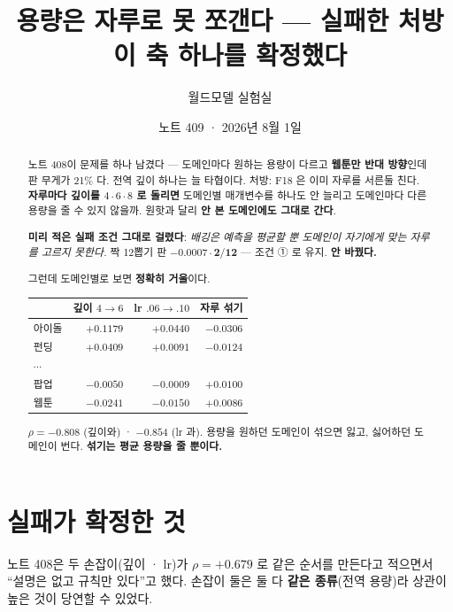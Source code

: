 \documentclass[11pt]{article}
\begin{document}
\title{용량은 자루로 못 쪼갠다 --- 실패한 처방이 축 하나를 확정했다}
\author{월드모델 실험실}
\date{노트 409 · 2026년 8월 1일}
\maketitle

\begin{abstract}
노트 408이 문제를 하나 남겼다 --- 도메인마다 원하는 용량이 다르고
\textbf{웹툰만 반대 방향}인데 판 무게가 21\% 다. 전역 깊이 하나는 늘
타협이다. 처방: F18 은 이미 자루를 서른둘 친다. \textbf{자루마다 깊이를
$4 \cdot 6 \cdot 8$ 로 돌리면} 도메인별 매개변수를 하나도 안 늘리고
도메인마다 다른 용량을 줄 수 있지 않을까. 원핫과 달리 \textbf{안 본
도메인에도 그대로 간다}.

\textbf{미리 적은 실패 조건 그대로 걸렸다}: \emph{배깅은 예측을 평균할 뿐
도메인이 자기에게 맞는 자루를 고르지 못한다.} 짝 12뽑기 판
$\mathbf{-0.0007 \cdot 2/12}$ --- 조건 ① 로 유지. \textbf{안 바꿨다.}

그런데 도메인별로 보면 \textbf{정확히 거울}이다.

\begin{center}
\begin{tabular}{lrrr}
\hline
 & 깊이 $4{\to}6$ & lr $.06{\to}.10$ & \textbf{자루 섞기} \\
\hline
아이돌 & $+0.1179$ & $+0.0440$ & $\mathbf{-0.0306}$ \\
펀딩 & $+0.0409$ & $+0.0091$ & $\mathbf{-0.0124}$ \\
$\cdots$ & & & \\
팝업 & $-0.0050$ & $-0.0009$ & $\mathbf{+0.0100}$ \\
웹툰 & $-0.0241$ & $-0.0150$ & $\mathbf{+0.0086}$ \\
\hline
\end{tabular}
\end{center}

$\rho = \mathbf{-0.808}$ (깊이와) · $\mathbf{-0.854}$ (lr 과). 용량을
원하던 도메인이 섞으면 잃고, 싫어하던 도메인이 번다. \textbf{섞기는 평균
용량을 줄 뿐이다.}
\end{abstract}

\section{실패가 확정한 것}

노트 408은 두 손잡이(깊이 · lr)가 $\rho{=}{+}0.679$ 로 같은 순서를 만든다고
적으면서 ``설명은 없고 규칙만 있다''고 했다. 손잡이 둘은 둘 다
\textbf{같은 종류}(전역 용량)라 상관이 높은 것이 당연할 수 있었다.
\end{document}
